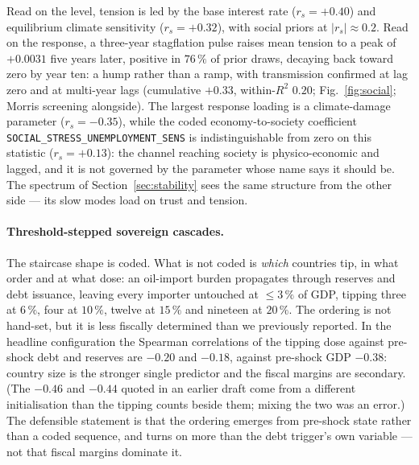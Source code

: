 \documentclass[12pt,a4paper]{article}
\begin{document}
Read on the level, tension is led by the base interest rate ($r_s=+0.40$) and equilibrium
climate sensitivity ($r_s=+0.32$), with social priors at $|r_s|\approx0.2$. Read on the
response, a three-year stagflation pulse raises mean tension to a peak of $+0.0031$ five years
later, positive in $76\,\%$ of prior draws, decaying back toward zero by year ten: a hump
rather than a ramp, with transmission confirmed at lag zero and at multi-year lags (cumulative
$+0.33$, within-$R^2$ $0.20$; Fig.~\ref{fig:social}; Morris screening
\citep{morris1991,campolongo2007} alongside). The largest response loading is a climate-damage
parameter ($r_s=-0.35$), while the coded economy-to-society coefficient
\texttt{SOCIAL\_STRESS\_UNEMPLOYMENT\_SENS} is indistinguishable from zero on this statistic
($r_s=+0.13$): the channel reaching society is physico-economic and lagged, and it is not
governed by the parameter whose name says it should be. The spectrum of
Section~\ref{sec:stability} sees the same structure from the other side --- its slow modes load
on trust and tension.

\paragraph{Threshold-stepped sovereign cascades.} The staircase shape is coded. What is not
coded is \emph{which} countries tip, in what order and at what dose: an oil-import burden
propagates through reserves and debt issuance, leaving every importer untouched at
${\leq}3\,\%$ of GDP, tipping three at $6\,\%$, four at $10\,\%$, twelve at $15\,\%$ and
nineteen at $20\,\%$. The ordering is not hand-set, but it is less fiscally determined than we
previously reported. In the headline configuration the Spearman correlations of the tipping
dose against pre-shock debt and reserves are $-0.20$ and $-0.18$, against pre-shock GDP
$-0.38$: country size is the stronger single predictor and the fiscal margins are secondary.
(The $-0.46$ and $-0.44$ quoted in an earlier draft come from a different initialisation than
the tipping counts beside them; mixing the two was an error.) The defensible statement is that
the ordering emerges from pre-shock state rather than a coded sequence, and turns on more than
the debt trigger's own variable --- not that fiscal margins dominate it.
\end{document}
